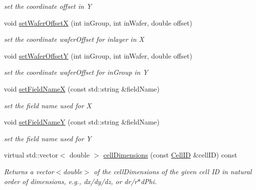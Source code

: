 \begin{DoxyCompactItemize}
\begin{DoxyCompactList}\small\item\em set the coordinate offset in Y \item\end{DoxyCompactList}\item 
void \hyperlink{class_d_d4hep_1_1_d_d_segmentation_1_1_wafer_grid_x_y_a95441c0bdca2bd9d72f5711a98bbec83}{setWaferOffsetX} (int inGroup, int inWafer, double offset)
\begin{DoxyCompactList}\small\item\em set the coordinate waferOffset for inlayer in X \item\end{DoxyCompactList}\item 
void \hyperlink{class_d_d4hep_1_1_d_d_segmentation_1_1_wafer_grid_x_y_acb1ddfacb3dd3702f7e7102cc29d3930}{setWaferOffsetY} (int inGroup, int inWafer, double offset)
\begin{DoxyCompactList}\small\item\em set the coordinate waferOffset for inGroup in Y \item\end{DoxyCompactList}\item 
void \hyperlink{class_d_d4hep_1_1_d_d_segmentation_1_1_wafer_grid_x_y_a4306fcd58177d9f24abd274a944eca6f}{setFieldNameX} (const std::string \&fieldName)
\begin{DoxyCompactList}\small\item\em set the field name used for X \item\end{DoxyCompactList}\item 
void \hyperlink{class_d_d4hep_1_1_d_d_segmentation_1_1_wafer_grid_x_y_a7ec7eba050ae07e10694ff0666a10d35}{setFieldNameY} (const std::string \&fieldName)
\begin{DoxyCompactList}\small\item\em set the field name used for Y \item\end{DoxyCompactList}\item 
virtual std::vector$<$ double $>$ \hyperlink{class_d_d4hep_1_1_d_d_segmentation_1_1_wafer_grid_x_y_ae063a2a9a60e5965a12cc3c18b851dab}{cellDimensions} (const \hyperlink{namespace_d_d4hep_1_1_d_d_segmentation_ac7af071d85cb48820914434a07e21ba1}{CellID} \&cellID) const 
\begin{DoxyCompactList}\small\item\em Returns a vector$<$double$>$ of the cellDimensions of the given cell ID in natural order of dimensions, e.g., dx/dy/dz, or dr/r$\ast$dPhi. \item\end{DoxyCompactList}\end{DoxyCompactItemize}
